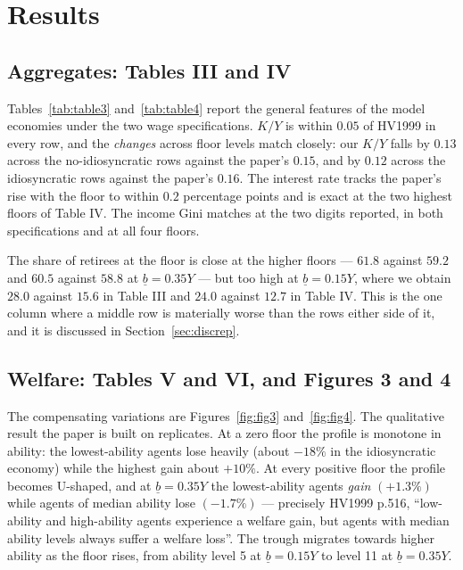 \documentclass[11pt,fleqn]{article}
\begin{document}
\section{Results}\label{sec:results}

\subsection*{Aggregates: Tables III and IV}

Tables~\ref{tab:table3} and~\ref{tab:table4} report the general features of the model
economies under the two wage specifications. $K/Y$ is within $0.05$ of HV1999 in every row,
and the \emph{changes} across floor levels match closely: our $K/Y$ falls by $0.13$ across the
no-idiosyncratic rows against the paper's $0.15$, and by $0.12$ across the idiosyncratic rows
against the paper's $0.16$. The interest rate tracks the paper's rise with the floor to within
$0.2$ percentage points and is exact at the two highest floors of Table IV. The income Gini
matches at the two digits reported, in both specifications and at all four floors.

The share of retirees at the floor is close at the higher floors --- $61.8$ against $59.2$ and
$60.5$ against $58.8$ at $\underline{b}=0.35Y$ --- but too high at $\underline{b}=0.15Y$,
where we obtain $28.0$ against $15.6$ in Table III and $24.0$ against $12.7$ in Table IV. This
is the one column where a middle row is materially worse than the rows either side of it, and
it is discussed in Section~\ref{sec:discrep}.

\subsection*{Welfare: Tables V and VI, and Figures 3 and 4}

The compensating variations are Figures~\ref{fig:fig3} and~\ref{fig:fig4}. The qualitative
result the paper is built on replicates. At a zero floor the profile is monotone in ability:
the lowest-ability agents lose heavily (about $-18\%$ in the idiosyncratic economy) while the
highest gain about $+10\%$. At every positive floor the profile becomes U-shaped, and at
$\underline{b}=0.35Y$ the lowest-ability agents \emph{gain} $(+1.3\%)$ while agents of median
ability lose $(-1.7\%)$ --- precisely HV1999 p.516, ``low-ability and high-ability agents
experience a welfare gain, but agents with median ability levels always suffer a welfare
loss''. The trough migrates towards higher ability as the floor rises, from ability level 5 at
$\underline{b}=0.15Y$ to level 11 at $\underline{b}=0.35Y$.
\end{document}
